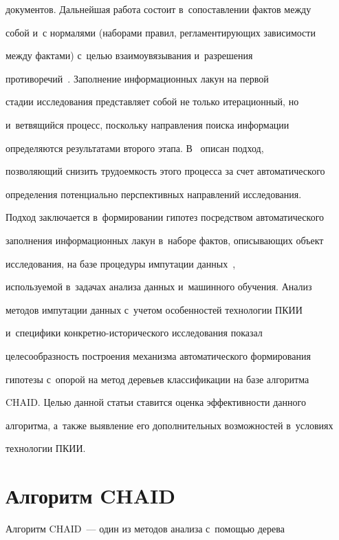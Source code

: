 документов. Дальнейшая работа состоит в~сопоставлении фактов между 


собой и~с нормалями (наборами правил, регламентирующих зависимости 


между фактами) с~целью взаимоувязывания и~разрешения 


противоречий~\cite{5-ad}. Заполнение информационных лакун на первой 


стадии исследования представляет собой не только итерационный, но 


и~ветвящийся процесс, поскольку направления поиска информации 


определяются результатами второго этапа. В~\cite{6-ad} описан подход, 


поз\-во\-ля\-ющий снизить трудоемкость этого процесса за счет автоматического 


определения потенциально перспективных направлений исследования. 


Подход заключается в~формировании гипотез посредством автоматического 


заполнения информационных лакун в~наборе фактов, описывающих объект 


исследования, на базе процедуры импутации данных~\cite{7-ad}, 


используемой в~задачах анализа данных и~машинного обучения. Анализ 


методов импутации данных с~учетом особенностей технологии ПКИИ 


и~специфики конкретно-исторического исследования показал 


целесообразность построения механизма автоматического формирования 


гипотезы с~опорой на метод деревьев классификации на базе алгоритма 


CHAID. \mbox{Целью} данной \mbox{статьи} ставится оценка эффективности данного 


алгоритма, а~также выявление его дополнительных возможностей в~условиях 


технологии ПКИИ.





\section{Алгоритм CHAID}





  Алгоритм CHAID~--- один из методов анализа с~помощью дерева 


